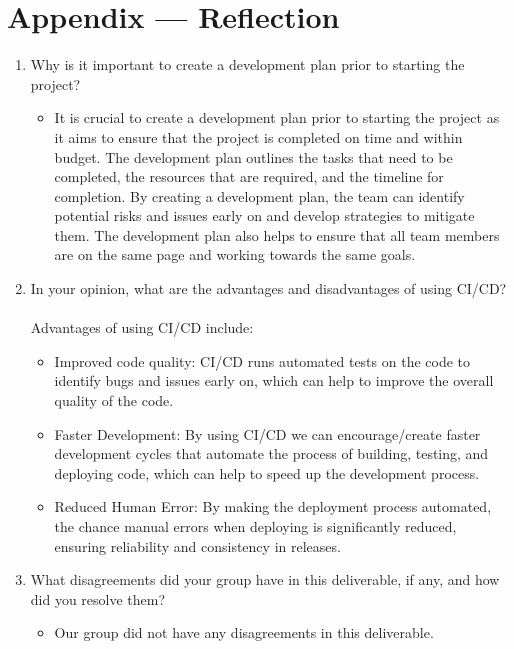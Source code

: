 \documentclass{article}
\begin{document}
\newpage{}

\section*{Appendix --- Reflection}

\begin{enumerate}
    \item Why is it important to create a development plan prior to starting the
    project?
    \begin{itemize}
        \item It is crucial to create a development plan prior to starting the project as it aims to ensure that the project is completed on time and within budget. The development plan outlines the tasks that need to be completed, the resources that are required, and the timeline for completion. By creating a development plan, the team can identify potential risks and issues early on and develop strategies to mitigate them. The development plan also helps to ensure that all team members are on the same page and working towards the same goals.
    \end{itemize}
    \item In your opinion, what are the advantages and disadvantages of using
    CI/CD? \\ \\
        Advantages of using CI/CD include:
        \begin{itemize}
        \item Improved code quality: CI/CD runs automated tests on the code to identify bugs and issues early on, which can help to improve the overall quality of the code.
        \item Faster Development: By using CI/CD we can encourage/create faster development cycles that automate the process of building, testing, and deploying code, which can help to speed up the development process.
        \item Reduced Human Error: By making the deployment process automated, the chance manual errors when deploying is significantly reduced, ensuring reliability and consistency in releases.
        \end{itemize}
    \item What disagreements did your group have in this deliverable, if any,
    and how did you resolve them?
    \begin{itemize}
        \item Our group did not have any disagreements in this deliverable.
    \end{itemize}
\end{enumerate}
\end{document}
